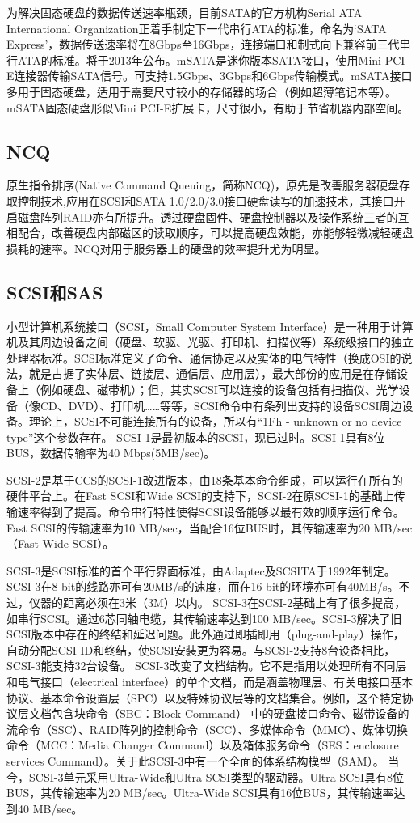 为解决固态硬盘的数据传送速率瓶颈，目前SATA的官方机构Serial ATA International Organization正着手制定下一代串行ATA的标准，命名为‘SATA Express’，数据传送速率将在8Gbps至16Gbps，连接端口和制式向下兼容前三代串行ATA的标准。将于2013年公布。mSATA是迷你版本SATA接口，使用Mini PCI-E连接器传输SATA信号。可支持1.5Gbps、3Gbps和6Gbps传输模式。mSATA接口多用于固态硬盘，适用于需要尺寸较小的存储器的场合（例如超薄笔记本等）。mSATA固态硬盘形似Mini PCI-E扩展卡，尺寸很小，有助于节省机器内部空间。

\subsection{NCQ}
原生指令排序(Native Command Queuing，简称NCQ)，原先是改善服务器硬盘存取控制技术,应用在SCSI和SATA 1.0/2.0/3.0接口硬盘读写的加速技术，其接口开启磁盘阵列RAID亦有所提升。透过硬盘固件、硬盘控制器以及操作系统三者的互相配合，改善硬盘内部磁区的读取顺序，可以提高硬盘效能，亦能够轻微减轻硬盘损耗的速率。NCQ对用于服务器上的硬盘的效率提升尤为明显。

\subsection{SCSI和SAS}
小型计算机系统接口（SCSI，Small Computer System Interface）是一种用于计算机及其周边设备之间（硬盘、软驱、光驱、打印机、扫描仪等）系统级接口的独立处理器标准。SCSI标准定义了命令、通信协定以及实体的电气特性（换成OSI的说法，就是占据了实体层、链接层、通信层、应用层），最大部份的应用是在存储设备上（例如硬盘、磁带机）；但，其实SCSI可以连接的设备包括有扫描仪、光学设备（像CD、DVD）、打印机……等等，SCSI命令中有条列出支持的设备SCSI周边设备。理论上，SCSI不可能连接所有的设备，所以有“1Fh - unknown or no device type”这个参数存在。
SCSI-1是最初版本的SCSI，现已过时。SCSI-1具有8位BUS，数据传输率为40 Mbps(5MB/sec)。

SCSI-2是基于CCS的SCSI-1改进版本，由18条基本命令组成，可以运行在所有的硬件平台上。在Fast SCSI和Wide SCSI的支持下，SCSI-2在原SCSI-1的基础上传输速率得到了提高。命令串行特性使得SCSI设备能够以最有效的顺序运行命令。Fast SCSI的传输速率为10 MB/sec，当配合16位BUS时，其传输速率为20 MB/sec（Fast-Wide SCSI）。

SCSI-3是SCSI标准的首个平行界面标准，由Adaptec及SCSITA于1992年制定。SCSI-3在8-bit的线路亦可有20MB/s的速度，而在16-bit的环境亦可有40MB/s。不过，仪器的距离必须在3米（3M）以内。 SCSI-3在SCSI-2基础上有了很多提高，如串行SCSI。通过6芯同轴电缆，其传输速率达到100 MB/sec。SCSI-3解决了旧SCSI版本中存在的终结和延迟问题。此外通过即插即用（plug-and-play）操作，自动分配SCSI ID和终结，使SCSI安装更为容易。与SCSI-2支持8台设备相比，SCSI-3能支持32台设备。 SCSI-3改变了文档结构。它不是指用以处理所有不同层和电气接口（electrical interface）的单个文档，而是涵盖物理层、有关电接口基本协议、基本命令设置层（SPC）以及特殊协议层等的文档集合。例如，这个特定协议层文档包含块命令（SBC：Block Command） 中的硬盘接口命令、磁带设备的流命令（SSC）、RAID阵列的控制命令（SCC）、多媒体命令（MMC）、媒体切换命令（MCC：Media Changer Command）以及箱体服务命令（SES：enclosure services Command）。关于此SCSI-3中有一个全面的体系结构模型（SAM）。 当今，SCSI-3单元采用Ultra-Wide和Ultra SCSI类型的驱动器。Ultra SCSI具有8位BUS，其传输速率为20 MB/sec。Ultra-Wide SCSI具有16位BUS，其传输速率达到40 MB/sec。

